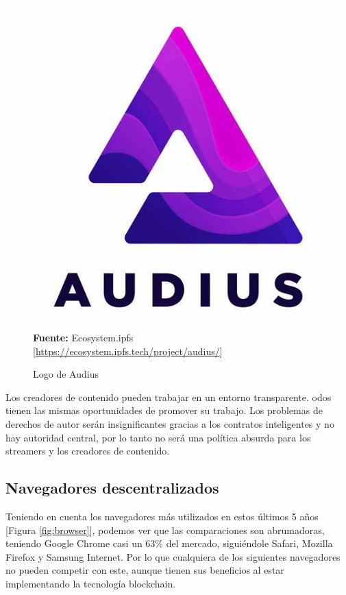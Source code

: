 \begin{figure}[htb!]
    \caption{Logo de Audius}
    \label{fig:audius}
    \centering
    \includegraphics[scale=0.25]{./Ilustraciones/logos/Audius.jpg}\\
    \textbf{Fuente:} Ecosystem.ipfs [\url{https://ecosystem.ipfs.tech/project/audius/}]
\end{figure}

\hfill \break
Los creadores de contenido pueden trabajar en un entorno transparente. odos
tienen las mismas oportunidades de promover su trabajo. Los problemas de
derechos de autor serán insignificantes gracias a los contratos inteligentes y
no hay autoridad central, por lo tanto no será una política absurda para los
streamers y los creadores de contenido.

\subsection*{Navegadores descentralizados}
\label{webs-browsers}
Teniendo en cuenta los navegadores más utilizados en estos últimos 5 años [Figura \ref{fig:browser}],
podemos ver que las comparaciones son abrumadoras, teniendo Google Chrome casi un 63\% del mercado,
siguiéndole Safari, Mozilla Firefox y Samsung Internet.
Por lo que cualquiera de los siguientes navegadores no pueden competir con este,
aunque tienen sus beneficios al estar implementando la tecnología blockchain.


